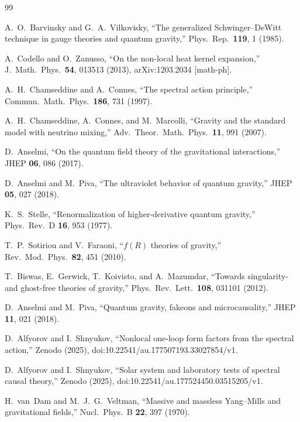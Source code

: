 \documentclass[12pt,a4paper]{article}
\begin{document}
\begin{thebibliography}{99}

A.~O.~Barvinsky and G.~A.~Vilkovisky,
``The generalized Schwinger--DeWitt technique in gauge theories and
quantum gravity,''
Phys.\ Rep.\ \textbf{119}, 1 (1985).

A.~Codello and O.~Zanusso,
``On the non-local heat kernel expansion,''
J.\ Math.\ Phys.\ \textbf{54}, 013513 (2013),
arXiv:1203.2034 [math-ph].

A.~H.~Chamseddine and A.~Connes,
``The spectral action principle,''
Commun.\ Math.\ Phys.\ \textbf{186}, 731 (1997).

A.~H.~Chamseddine, A.~Connes, and M.~Marcolli,
``Gravity and the standard model with neutrino mixing,''
Adv.\ Theor.\ Math.\ Phys.\ \textbf{11}, 991 (2007).

D.~Anselmi,
``On the quantum field theory of the gravitational interactions,''
JHEP \textbf{06}, 086 (2017).

D.~Anselmi and M.~Piva,
``The ultraviolet behavior of quantum gravity,''
JHEP \textbf{05}, 027 (2018).

K.~S.~Stelle,
``Renormalization of higher-derivative quantum gravity,''
Phys.\ Rev.\ D \textbf{16}, 953 (1977).

T.~P.~Sotiriou and V.~Faraoni,
``$f(R)$ theories of gravity,''
Rev.\ Mod.\ Phys.\ \textbf{82}, 451 (2010).

T.~Biswas, E.~Gerwick, T.~Koivisto, and A.~Mazumdar,
``Towards singularity- and ghost-free theories of gravity,''
Phys.\ Rev.\ Lett.\ \textbf{108}, 031101 (2012).

D.~Anselmi and M.~Piva,
``Quantum gravity, fakeons and microcausality,''
JHEP \textbf{11}, 021 (2018).

D.~Alfyorov and I.~Shnyukov,
``Nonlocal one-loop form factors from the spectral action,''
Zenodo (2025), doi:10.22541/au.177507193.33027854/v1.

D.~Alfyorov and I.~Shnyukov,
``Solar system and laboratory tests of spectral causal theory,''
Zenodo (2025), doi:10.22541/au.177524450.03515205/v1.

H.~van~Dam and M.~J.~G.~Veltman,
``Massive and massless Yang--Mills and gravitational fields,''
Nucl.\ Phys.\ B \textbf{22}, 397 (1970).


\end{thebibliography}
\end{document}
